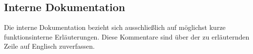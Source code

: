 \subsection{Interne Dokumentation}
Die interne Dokumentation bezieht sich ausschließlich auf möglichst kurze funktionsinterne Erläuterungen. Diese Kommentare sind über der zu erläuternden Zeile auf Englisch zuverfassen.